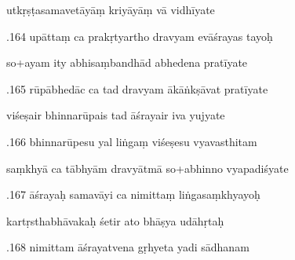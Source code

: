 \documentclass[article,12pt,a4paper]{memoir}%
\newcounter{parCount}
\begin{document}
	  
	  \pstart \leavevmode%
	utkṛṣṭasamavetāyāṃ kriyāyāṃ vā vidhīyate 
	{}
	\pend%
      

	  
	  \pstart {}.164 upāttaṃ ca prakṛtyartho dravyam evāśrayas tayoḥ 
	{}
	\pend%
      

	  
	  \pstart \leavevmode%
	so+ayam ity abhisaṃbandhād abhedena pratīyate 
	{}
	\pend%
      

	  
	  \pstart {}.165 rūpābhedāc ca tad dravyam ākāṅkṣāvat pratīyate 
	{}
	\pend%
      

	  
	  \pstart \leavevmode%
	viśeṣair bhinnarūpais tad āśrayair iva yujyate 
	{}
	\pend%
      

	  
	  \pstart {}.166 bhinnarūpesu yal liṅgaṃ viśeṣesu vyavasthitam 
	{}
	\pend%
      

	  
	  \pstart \leavevmode%
	saṃkhyā ca tābhyām dravyātmā so+abhinno vyapadiśyate 
	{}
	\pend%
      

	  
	  \pstart {}.167 āśrayaḥ samavāyi ca nimittaṃ liṅgasaṃkhyayoḥ 
	{}
	\pend%
      

	  
	  \pstart \leavevmode%
	kartṛsthabhāvakaḥ śetir ato bhāṣya udāhṛtaḥ 
	{}
	\pend%
      

	  
	  \pstart {}.168 nimittam āśrayatvena gṛhyeta yadi sādhanam 
	{}
	\pend%
      
\end{document}
